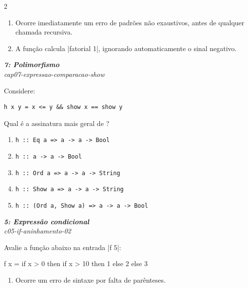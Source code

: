 \documentclass[a4paper,10pt,brazil]{article}
\begin{document}
\begin{multicols}{2}
\begin{enumerate}
  \item Ocorre imediatamente um erro de padrões não exaustivos, antes de qualquer chamada recursiva.

  \item A função calcula \haskellinline|fatorial 1|, ignorando automaticamente o sinal negativo.


\end{enumerate}

\begin{flushright}
  \footnotesize
  \textit{\textbf{7: Polimorfismo}}\\
  \textit{cap07-expressao-comparacao-show}\\

\end{flushright}
Considere:

\begin{verbatim}
h x y = x <= y && show x == show y
\end{verbatim}

Qual é a assinatura mais geral de ?

\begin{enumerate}
  \item \texttt{h :: Eq a => a -> a -> Bool}
  \item \texttt{h :: a -> a -> Bool}
  \item \texttt{h :: Ord a => a -> a -> String}
  \item \texttt{h :: Show a => a -> a -> String}
  \item \texttt{h :: (Ord a, Show a) => a -> a -> Bool}

\end{enumerate}

\begin{flushright}
  \footnotesize
  \textit{\textbf{5: Expressão condicional}}\\
  \textit{c05-if-aninhamento-02}\\

\end{flushright}
Avalie a função abaixo na entrada \haskellinline|f 5|:
\begin{haskellcode}
f x = if x > 0
      then if x > 10
           then 1
           else 2
      else 3
\end{haskellcode}

\begin{enumerate}
  \item Ocorre um erro de sintaxe por falta de parênteses.


\end{enumerate}
\end{multicols}
\end{document}
